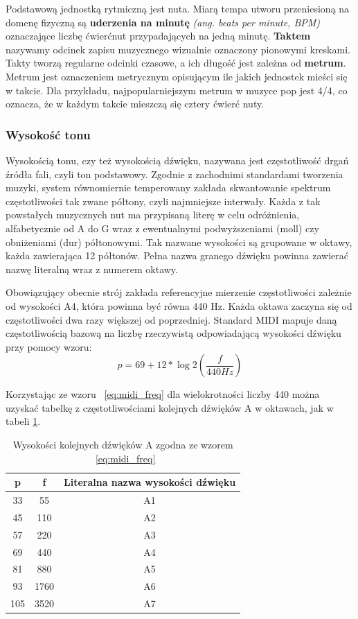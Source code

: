 \documentclass[12pt,a4paper,twoside]{mwart}
\begin{document}
Podstawową jednostką rytmiczną jest nuta. Miarą tempa utworu przeniesioną na domenę fizyczną są \textbf{uderzenia na minutę} \textit{(ang. beats per minute, BPM)} oznaczające liczbę ćwierćnut przypadających na jedną minutę. \textbf{Taktem} nazywamy odcinek zapisu muzycznego wizualnie oznaczony pionowymi kreskami. Takty tworzą regularne odcinki czasowe, a ich długość jest zależna od \textbf{metrum}. Metrum jest oznaczeniem metrycznym opisującym ile jakich jednostek mieści się w takcie. Dla przykładu, najpopularniejszym metrum w muzyce pop jest 4/4, co oznacza, że w każdym takcie mieszczą się cztery ćwierć nuty.

\subsubsection{Wysokość tonu}
Wysokością tonu, czy też wysokością dźwięku, nazywana jest częstotliwość drgań źródła fali, czyli ton podstawowy. Zgodnie z zachodnimi standardami tworzenia muzyki, system równomiernie temperowany zakłada skwantowanie spektrum częstotliwości tak zwane półtony, czyli najmniejsze interwały. Każda z tak powstałych muzycznych nut ma przypisaną literę w celu odróżnienia, alfabetycznie od A do G wraz z ewentualnymi podwyższeniami (moll) czy obniżeniami (dur) półtonowymi. Tak nazwane wysokości są grupowane w oktawy, każda zawierająca 12 półtonów. Pełna nazwa granego dźwięku powinna zawierać nazwę literalną wraz z numerem oktawy.

Obowiązujący obecnie strój zakłada referencyjne mierzenie częstotliwości zależnie od wysokości A4, która powinna być równa 440 Hz. Każda oktawa zaczyna się od częstotliwości dwa razy większej od poprzedniej. Standard MIDI\cite[67-71]{Homerecording:LevelUp} mapuje daną częstotliwością bazową na liczbę rzeczywistą odpowiadającą wysokości dźwięku przy pomocy wzoru:
\begin{equation} \label{eq:midi_freq}
p = 69 + 12 * \log{2}(\frac{f}{440 Hz})
\end{equation}

Korzystając ze wzoru ~\ref{eq:midi_freq} dla wielokrotności liczby 440 można uzyskać tabelkę z częstotliwościami kolejnych dźwięków A w oktawach, jak w tabeli \ref{tab:FqMidi}.

\begin{table}[H]
  \begin{center}
    \begin{tabular}{ |c|c|c| } 
    \hline
    p & f & Literalna nazwa wysokości dźwięku\\
    \hline
    33 & 55 & A1\\
    45 & 110 & A2\\
    57 & 220 & A3\\
    69 & 440 & A4\\
    81 & 880 & A5\\
    93 & 1760 & A6\\
    105 & 3520 & A7\\
    \hline
    \end{tabular}
  \end{center}
  \caption{Wysokości kolejnych dźwięków A zgodna ze wzorem ~\ref{eq:midi_freq}}
  \label{tab:FqMidi}
\end{table}
\end{document}
